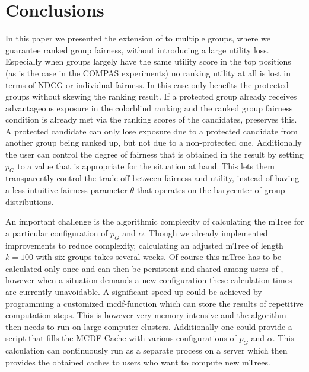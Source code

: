 \section{Conclusions}\label{sec:conclusions}

In this paper we presented the extension of \algoFAIR to multiple groups, where we guarantee ranked group fairness, without introducing a large utility loss.
%
Especially when groups largely have the same utility score in the top positions (as is the case in the COMPAS experiments) no ranking utility at all is lost in terms of NDCG or individual fairness.
%
In this case \algoFAIR only benefits the protected groups without skewing the ranking result.
%
If a protected group already receives advantageous exposure in the colorblind ranking and the ranked group fairness condition is already met via the ranking scores of the candidates, \algoFAIR preserves this.
%
A protected candidate can only lose exposure due to a protected candidate from another group being ranked up, but not due to a non-protected one.
%
Additionally the user can control the degree of fairness that is obtained in the result by setting $p_G$ to a value that is appropriate for the situation at hand.
%
This lets them transparently control the trade-off between fairness and utility, instead of having a less intuitive fairness parameter $\theta$ that operates on the barycenter of group distributions.

%
An important challenge is the algorithmic complexity of calculating the mTree for a particular configuration of $p_G$ and $\alpha$.
%
Though we already implemented improvements to reduce complexity, calculating an adjusted mTree of length $k=100$ with six groups takes several weeks.
%
Of course this mTree has to be calculated only once and can then be persistent and shared among users of \algoFAIR, however when a situation demands a new configuration these calculation times are currently unavoidable.
%
A significant speed-up could be achieved by programming a customized mcdf-function which can store the results of repetitive computation steps.
%
This is however very memory-intensive and the algorithm then needs to run on large computer clusters.
%
Additionally one could provide a script that fills the MCDF Cache with various configurations of $p_G$ and $\alpha$.
%
This calculation can continuously run as a separate process on a server which then provides the obtained caches to users who want to compute new mTrees.

